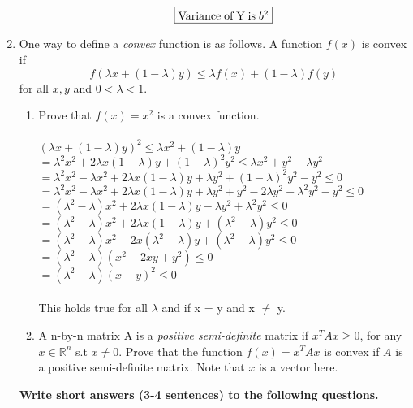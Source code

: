\documentclass{article}
\begin{document}
\begin{enumerate}
\begin{enumerate}
$$\fbox{\begin{minipage}{8em}
Variance of Y is $b^2$
\end{minipage}}$$
\end{enumerate}


\item One way to define a \emph{convex} function is as follows. A function $f(x)$ is
convex if
$$f(\lambda x + (1 - \lambda )y) \leq \lambda f(x) + (1 - \lambda )f(y)$$
for all $x, y$ and $0 < \lambda < 1$.
\begin{enumerate}
\item Prove that $f(x) = x^2$ is a convex function. \\
\\
\large
$(\lambda x + (1 - \lambda )y)^2 \leq \lambda x^2 + (1 - \lambda )y$\\
$= \lambda ^2 x^2 + 2 \lambda x(1 - \lambda) y + (1 - \lambda)^2 y^2 \leq \lambda x^2 + y^2 - \lambda y^2$\\
$= \lambda ^2 x^2 - \lambda x^2 + 2 \lambda x(1 - \lambda) y + \lambda y^2 + (1 - \lambda)^2 y^2  - y^2  \leq 0$\\
$= \lambda ^2 x^2 - \lambda x^2 + 2 \lambda x(1 - \lambda) y + \lambda y^2 + y^2 - 2\lambda y^2 + \lambda ^2y^2  - y^2  \leq 0$\\
$= (\lambda ^2 - \lambda) x^2 + 2 \lambda x(1 - \lambda) y - \lambda y^2 + \lambda ^2y^2 \leq 0$\\
$= (\lambda ^2 - \lambda) x^2 + 2 \lambda x(1 - \lambda) y + (\lambda ^2 - \lambda) y^2  \leq 0$\\
$= (\lambda ^2 - \lambda) x^2 - 2 x(\lambda^2 - \lambda) y + (\lambda ^2 - \lambda) y^2  \leq 0$\\
$= (\lambda ^2 - \lambda) (x^2 - 2 x y +  y^2)  \leq 0$\\
$= (\lambda ^2 - \lambda) (x -  y)^2  \leq 0$\\
\normalsize \\
This holds true for all $\lambda$ and if x = y and x $\neq$ y.\\


\item A n-by-n matrix A is a \emph{positive semi-definite} matrix if $x^TAx \geq 0$, for any $x \in \mathbb R^n$
s.t $x \neq 0$. Prove that the function $f(x) = x^TAx$ is convex if $A$ is a positive semi-definite
matrix. Note that $x$ is a vector here.
\end{enumerate}


\newpage
\textbf{Write short answers (3-4 sentences) to the following questions.}


\end{enumerate}
\end{document}
